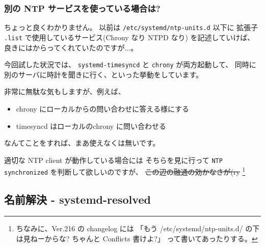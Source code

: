 \documentclass[mingoth,a4paper]{jsarticle}
\begin{document}
\subsubsection{別の NTP サービスを使っている場合は?}

ちょっと良くわかりません。
以前は \verb|/etc/systemd/ntp-units.d| 以下に
拡張子 \verb|.list| で使用しているサービス(Chrony なり NTPD なり) を記述していけば、
良きにはからってくれていたのですが$\dots$。

今回試した状況では、
\verb|systemd-timesyncd| と \verb|chrony| が両方起動して、
同時に別のサーバに時計を聞きに行く、といった挙動をしています。

非常に無駄な気もしますが、例えば、
\begin{itemize}
\item %
  chrony にローカルからの問い合わせに答える様にする
\item %
  timesyncd はローカルのchrony に問い合わせる
\end{itemize}
なんてことをすれば、まあ使えなくは無いです。

適切な NTP client が動作している場合には
そちらを見に行って \verb|NTP synchronized| を判断して欲しいのですが、
\sout{この辺の融通の効かなさが(ry}
\footnote{%
ちなみに、Ver.216 の changelog には
「もう /etc/systemd/ntp-units.d/ の下は見ねーからな? ちゃんと Conflicts 書けよ?」
って書いてあったりする。
}

\subsection{名前解決 - systemd-resolved}
\end{document}

